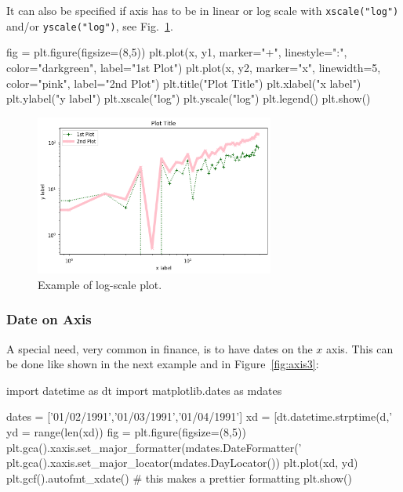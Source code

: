 It can also be specified if axis has to be in linear or log scale with \texttt{xscale("log")} and/or \texttt{yscale("log")}, see Fig.~\ref{fig:axis2}.

\begin{ipython}
fig = plt.figure(figsize=(8,5))
plt.plot(x, y1, marker="+", linestyle=":", color="darkgreen", label="1st Plot")
plt.plot(x, y2, marker="x", linewidth=5, color="pink", label="2nd Plot")
plt.title("Plot Title")
plt.xlabel("x label")
plt.ylabel("y label")
plt.xscale("log")
plt.yscale("log")
plt.legend()
plt.show()
\end{ipython}

\begin{figure}[htb]
	\centering
	\includegraphics[width=0.7\textwidth]{figures/axis2}
	\caption{Example of log-scale plot.}
	\label{fig:axis2}
\end{figure}

\subsubsection{Date on Axis}\label{date-on-axis}

A special need, very common in finance, is to have dates on the \(x\) axis. This can be done like shown in the next example and in Figure~\ref{fig:axis3}:

\begin{ipython}
import datetime as dt
import matplotlib.dates as mdates

dates = ['01/02/1991','01/03/1991','01/04/1991']
xd = [dt.datetime.strptime(d,'%
yd = range(len(xd))
fig = plt.figure(figsize=(8,5))
plt.gca().xaxis.set_major_formatter(mdates.DateFormatter('%
plt.gca().xaxis.set_major_locator(mdates.DayLocator())
plt.plot(xd, yd)
plt.gcf().autofmt_xdate() # this makes a prettier formatting
plt.show()
\end{ipython}

